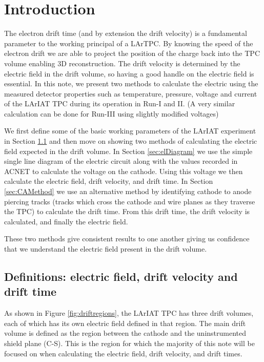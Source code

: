 \section{Introduction}\label{sec:Introduction} \label{sec:Intro}
The electron drift time (and by extension the drift velocity) is a fundamental parameter to the working principal of a LArTPC. By knowing the speed of the electron drift we are able to project the position of the charge back into the TPC volume enabling 3D reconstruction. The drift velocity is determined by the electric field in the drift volume, so having a good handle on the electric field is essential. In this note, we present two methods to calculate the electric using the measured detector properties such as temperature, pressure, voltage and current of the LArIAT TPC during its operation in Run-I and II. (A very similar calculation can be done for Run-III using slightly modified voltages)

We first define some of the basic working parameters of the LArIAT experiment in Section \ref{sec:Def} and then move on showing two methods of calculating the electric field expected in the drift volume. In Section \ref{sec:elDiagram} we use the simple single line diagram of the electric circuit along with the values recorded in ACNET to calculate the voltage on the cathode. Using this voltage we then calculate the electric field, drift velocity, and drift time. In Section \ref{sec:CAMethod} we use an alternative method by identifying cathode to anode piercing tracks (tracks which cross the cathode and wire planes as they traverse the TPC) to calculate the drift time. From this drift time, the drift velocity is calculated, and finally the electric field. 

These two methods give consistent results to one another giving us confidence that we understand the electric field present in the drift volume.

\subsection{Definitions: electric field, drift velocity and drift time }\label{sec:Def}
As shown in Figure \ref{fig:driftregions}, the LArIAT TPC has three drift volumes, each of which has its own electric field defined in that region. The main drift volume is defined as the region between the cathode and the uninstrumented shield plane (C-S). This is the region for which the majority of this note will be focused on when calculating the electric field, drift velocity, and drift times.


